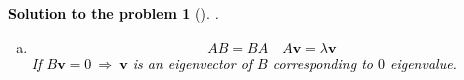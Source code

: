 \documentclass[12pt,a4]{article}
\newtheorem{solution}{Solution to the problem}
\newcommand{\bR}{{\mathbb R}}
\newcommand{\bv}{{\mathbf v}}
\begin{document}
\textcolor{black}{
\begin{solution}[]\rm .
\begin{enumerate}[(a)]
\item
\[
AB = BA
\quad
A\bv = \lambda\bv
\]
If $B\bv = 0 ~\Rightarrow~ \bv$ is an eigenvector of $B$ corresponding to $0$ eigenvalue.\\

\end{enumerate}
\end{solution}}
\end{document}
